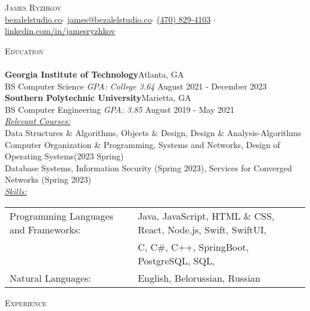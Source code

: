 \documentclass[a4paper]{article}
\newcommand{\lineunder} {
    \vspace*{-8pt} \\
    \hspace*{-18pt} \hrulefill \\
}
\newcommand{\header} [1] {
    {\hspace*{-18pt}\vspace*{6pt} \textsc{#1}}
    \vspace*{-6pt} \lineunder
}
\begin{document}
\vspace*{-40pt}

    

\vspace*{-10pt}
\begin{center}
	{\Huge \scshape {James Ryzhkov}}\\
	\href{https://bezalelstudio.co}{bezalelstudio.co}$\cdot$ \href{mailto:james@bezalelstudio.co}{james@bezalelstudio.co}$\cdot$ \href{tel:4708294103}{(470) 829-4103} $\cdot$\href{https://www.linkedin.com/in/jamesryzhkov/}{linkedin.com/in/jamesryzhkov} \\
\end{center}

\header{Education}
\textbf{Georgia Institute of Technology}\hfill Atlanta, GA\\
BS Computer Science \textit{GPA: College 3.64} \hfill August 2021 - December 2023\\
\vspace{2mm}
\textbf{Southern Polytechnic University}\hfill Marietta, GA\\
BS Computer Engineering \textit{GPA: 3.85} \hfill August 2019 - May 2021\\
\vspace{2mm}
\emph{\underline{Relevant Courses:}} \\
 Data Structures \& Algorithms, Objects \& Design, Design \& Analysis-Algorithms\\
Computer Organization \& Programming, Systems and Networks, Design of Operating Systems(2023 Spring)\\
Database Systems, Information Security (Spring 2023), Services for Converged Networks (Spring 2023)\\
\vspace*{2mm}
\emph{\underline{Skills:}} \\
\begin{tabular}{ l l }
	Programming Languages and Frameworks: & Java, JavaScript, HTML \& CSS, React, Node.js, Swift, SwiftUI, \\& C, C\#, C++,  SpringBoot, PostgreSQL, SQL,                      \\
	Natural Languages:                            & English, Belorussian, Russian                            \\
\end{tabular}

\header{Experience}
\vspace{1mm}
\end{document}
